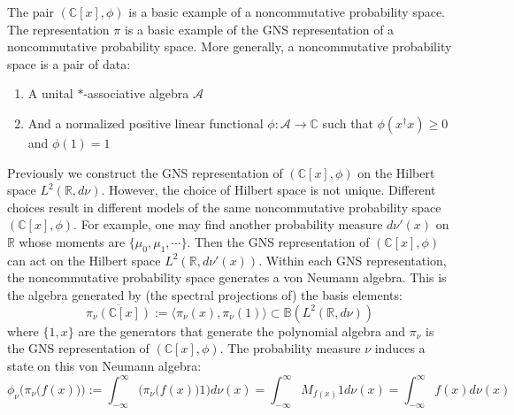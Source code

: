 \documentclass[a4paper,11pt]{article}
\theoremstyle{definition}
\numberwithin{equation}{section}
\begin{document}
The pair $(\mathbb{C}[x],\phi)$ is a basic example of a noncommutative probability space. The representation $\pi$ is a basic example of the GNS representation of a noncommutative probability space. More generally, a noncommutative probability space is a pair of data:
\begin{enumerate}
    \item A unital $*$-associative algebra $\mathcal{A}$
    \item And a normalized positive linear functional $\phi:\mathcal{A}\rightarrow\mathbb{C}$ such that $\phi(x^\dagger x)\geq 0$ and $\phi(1) = 1$
\end{enumerate}

Previously we construct the GNS representation of $(\mathbb{C}[x],\phi)$ on the Hilbert space $L^2(\mathbb{R},d\nu)$. However, the choice of Hilbert space is not unique. Different choices result in different models of the same noncommutative probability space $(\mathbb{C}[x],\phi)$. For example, one may find another probability measure $d\nu'(x)$ on $\mathbb{R}$ whose moments are $\{\mu_0,\mu_1,\cdots\}$. Then the GNS representation of $(\mathbb{C}[x],\phi)$ can act on the Hilbert space $L^2(\mathbb{R},d\nu'(x))$. Within each GNS representation, the noncommutative probability space generates a von Neumann algebra. This is the algebra generated by (the spectral projections of) the basis elements:
\begin{equation}
    \overline{\pi_\nu(\mathbb{C}[x])} := \langle\pi_\nu(x), \pi_\nu(1)\rangle\subset\mathbb{B}(L^2(\mathbb{R},d\nu))
\end{equation}
where $\{1,x\}$ are the generators that generate the polynomial algebra and $\pi_\nu$ is the GNS representation of $(\mathbb{C}[x],\phi)$. The probability measure $\nu$ induces a state on this von Neumann algebra:
\begin{equation}
    \phi_\nu\bigg(\pi_\nu\big(f(x)\big)\bigg) := \int_{-\infty}^\infty \bigg(\pi_\nu\big(f(x)\big)1\bigg) d\nu(x) = \int_{-\infty}^\infty M_{f(x)}1d\nu(x) = \int_{-\infty}^\infty f(x)d\nu(x)
\end{equation}
\end{document}
